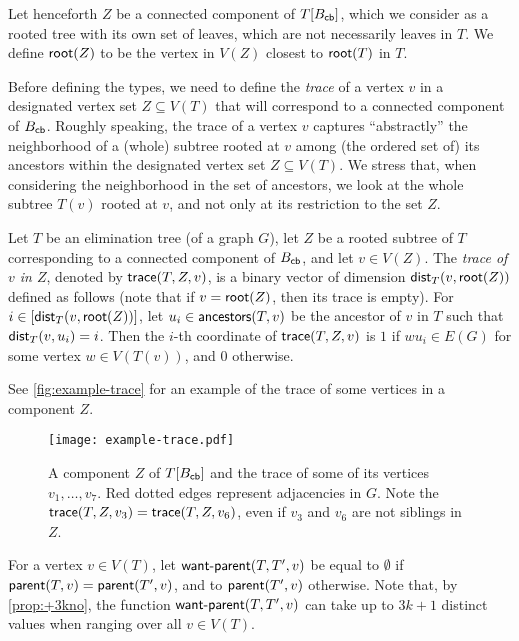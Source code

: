 \documentclass[a4paper,UKenglish,cleveref, autoref, thm-restate]{lipics-v2021}
\newcommand{\parent}{{\sf parent}\xspace}
\renewcommand{\root}{{\sf root}\xspace}
\newcommand{\anc}{{\sf ancestors}\xspace}
\newcommand{\dist}{{\sf dist}\xspace}
\newcommand{\Bcb}{B_{\sf cb}\xspace}
\newcommand{\trace}{{\sf trace}\xspace}
\newcommand{\wantparent}{{\sf {\sf want{\text -}parent}}\xspace}
\begin{document}
Let henceforth $Z$ be a connected component of $T[\Bcb]$, which we consider as a rooted tree with its own set of leaves, which are not necessarily leaves in $T$. We define $\root(Z)$ to be the vertex in $V(Z)$ closest to $\root(T)$ in $T$.


Before defining the types, we need to define the \textit{trace} of a vertex $v$ in a designated vertex set $Z \subseteq V(T)$ that will correspond to a connected component of $\Bcb$. Roughly speaking, the trace of a vertex $v$ captures ``abstractly'' the neighborhood of a (whole) subtree rooted at $v$ among (the ordered set of) its ancestors within the designated vertex set $Z \subseteq V(T)$. We stress that, when considering the neighborhood in the set of ancestors,  we look at the whole subtree $T(v)$ rooted at $v$, and not only at its restriction to the set $Z$.






\begin{definition}
\label{def:trace}
Let $T$ be an elimination tree (of a graph $G$), let $Z$ be a rooted subtree of $T$ corresponding to a connected component of $\Bcb$, and let $v \in V(Z)$. The \emph{trace of $v$ in $Z$}, denoted by $\trace(T,Z,v)$, is a binary vector of dimension $\dist_T(v,\root(Z))$ defined as follows (note that if $v=\root(Z)$, then its trace is empty). For $i \in [\dist_T(v,\root(Z))]$, let $u_i \in \anc(T,v)$ be the ancestor of $v$ in $T$ such that $\dist_T(v,u_i)=i$. Then the $i$-th coordinate of $\trace(T,Z,v)$ is $1$ if $wu_i \in E(G)$ for some vertex $w \in V(T(v))$, and $0$ otherwise.
\end{definition}

See \autoref{fig:example-trace} for an example of the trace of some vertices in a component $Z$.

\begin{figure}[h!tb]
    \centering
\texttt{[image: example-trace.pdf]}
    \caption{A component $Z$ of $T[\Bcb]$ and the trace of some of its vertices $v_1, \ldots,v_7$. Red dotted edges represent adjacencies in $G$. Note the  ${\sf trace}(T,Z,v_3) = {\sf trace}(T,Z,v_6)$, even if $v_3$ and $v_6$ are not siblings in $Z$.\label{fig:example-trace}}
\end{figure}








For a vertex $v \in V(T)$, let $\wantparent(T,T',v)$ be equal to $\emptyset$ if $\parent(T,v) = \parent(T',v)$, and to $\parent(T',v)$ otherwise. Note that, by \autoref{prop:+3kno}, the function $\wantparent(T,T',v)$ can take up to $3k+1$ distinct values when ranging over all $v \in V(T)$.
\end{document}
